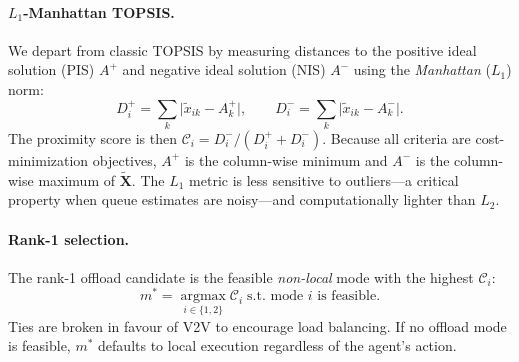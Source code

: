 \documentclass[iicol]{sn-jnl}
\begin{document}
\paragraph{$L_1$-Manhattan TOPSIS.}
We depart from classic TOPSIS by measuring distances to the positive ideal
solution (PIS) $A^+$ and negative ideal solution (NIS) $A^-$ using the
\emph{Manhattan} ($L_1$) norm:
\begin{equation}
  D_i^+ = \textstyle\sum_{k} \lvert \widetilde{x}_{ik} - A_k^+ \rvert,
  \qquad
  D_i^- = \textstyle\sum_{k} \lvert \widetilde{x}_{ik} - A_k^- \rvert.
  \label{eq:manhattan}
\end{equation}
The proximity score is then $\mathcal{C}_i = D_i^- / (D_i^+ + D_i^-)$.
Because all criteria are cost-minimization objectives, $A^+$ is the
column-wise minimum and $A^-$ is the column-wise maximum of
$\widetilde{\mathbf{X}}$.
The $L_1$ metric is less sensitive to outliers—a critical property when
queue estimates are noisy—and computationally lighter than $L_2$.

\paragraph{Rank-1 selection.}
The rank-1 offload candidate is the feasible \emph{non-local} mode with the
highest $\mathcal{C}_i$:
\begin{equation}
  m^* = \operatorname*{argmax}_{i \in \{1,2\}} \mathcal{C}_i
        \;\text{s.t.\ mode } i \text{ is feasible}.
  \label{eq:rank1}
\end{equation}
Ties are broken in favour of V2V to encourage load balancing.
If no offload mode is feasible, $m^*$ defaults to local execution regardless
of the agent's action.
\end{document}
